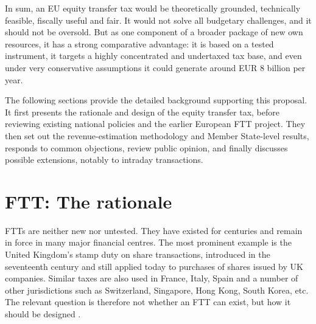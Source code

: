 \documentclass[../../main]{subfiles}
\begin{document}
In sum, an EU equity transfer tax would be theoretically grounded, technically feasible, fiscally useful and fair. It would not solve all budgetary challenges, and it should not be oversold. But as one component of a broader package of new own resources, it has a strong comparative advantage: it is based on a tested instrument, it targets a highly concentrated and undertaxed tax base, and even under very conservative assumptions it could generate around EUR 8 billion per year.

The following sections provide the detailed background supporting this proposal. It first presents the rationale and design of the equity transfer tax, before reviewing existing national policies and the earlier European FTT project. They then set out the revenue-estimation methodology and Member State-level results, responds to common objections, review public opinion, and finally discusses possible extensions, notably to intraday transactions.







\section{FTT: The rationale}

FTTs are neither new nor untested. They have existed for centuries and remain in force in many major financial centres. The most prominent example is the United Kingdom’s stamp duty on share transactions, introduced in the seventeenth century and still applied today to purchases of shares issued by UK companies. Similar taxes are also used in France, Italy, Spain and a number of other jurisdictions such as Switzerland, Singapore, Hong Kong, South Korea, etc. The relevant question is therefore not whether an FTT can exist, but how it should be designed \citep{CapelleBlancard2024}.
\end{document}
